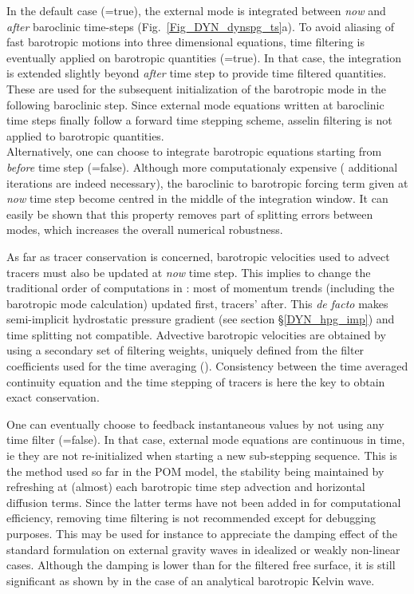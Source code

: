 In the default case (=true), the external mode is integrated 
between \textit{now} and  \textit{after} baroclinic time-steps (Fig.~\ref{Fig_DYN_dynspg_ts}a). To avoid aliasing of fast barotropic motions into three dimensional equations, time filtering is eventually applied on barotropic 
quantities (=true). In that case, the integration is extended slightly beyond  \textit{after} time step to provide time filtered quantities. 
These are used for the subsequent initialization of the barotropic mode in the following baroclinic step. 
Since external mode equations written at baroclinic time steps finally follow a forward time stepping scheme, 
asselin filtering is not applied to barotropic quantities. \\
Alternatively, one can choose to integrate barotropic equations starting 
from \textit{before} time step (=false). Although more computationaly expensive (  additional iterations are indeed necessary), the baroclinic to barotropic forcing term given at \textit{now} time step 
become centred in the middle of the integration window. It can easily be shown that this property 
removes part of splitting errors between modes, which increases the overall numerical robustness.


As far as tracer conservation is concerned, barotropic velocities used to advect tracers must also be updated 
at \textit{now} time step. This implies to change the traditional order of computations in \NEMO: most of momentum  
trends (including the barotropic mode calculation) updated first, tracers' after. This \textit{de facto} makes semi-implicit hydrostatic 
pressure gradient (see section \S\ref{DYN_hpg_imp}) and time splitting not compatible. 
Advective barotropic velocities are obtained by using a secondary set of filtering weights, uniquely defined from the filter 
coefficients used for the time averaging (\citet{Shchepetkin_McWilliams_OM05}). Consistency between the time averaged continuity equation and the time stepping of tracers is here the key to obtain exact conservation.


One can eventually choose to feedback instantaneous values by not using any time filter (=false). 
In that case, external mode equations are continuous in time, ie they are not re-initialized when starting a new 
sub-stepping sequence. This is the method used so far in the POM model, the stability being maintained by refreshing at (almost) 
each barotropic time step advection and horizontal diffusion terms. Since the latter terms have not been added in \NEMO for 
computational efficiency, removing time filtering is not recommended except for debugging purposes. 
This may be used for instance to appreciate the damping effect of the standard formulation on external gravity waves in idealized or weakly non-linear cases. Although the damping is lower than for the filtered free surface, it is still significant as shown by \citet{Levier2007} in the case of an analytical barotropic Kelvin wave.

